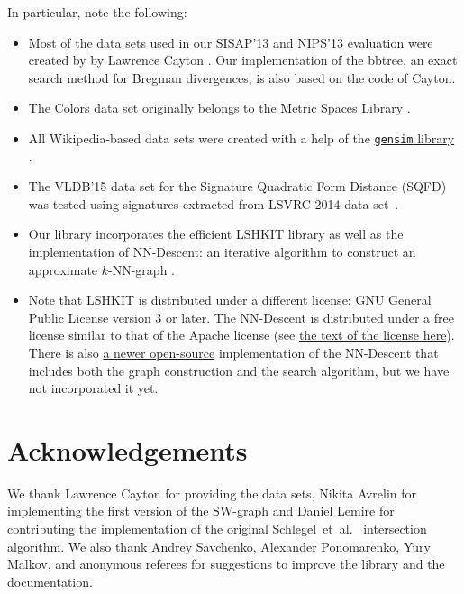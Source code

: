 \documentclass[runningheads,a4paper]{llncs}
\newcommand{\ttt}[1]{\texttt{#1}}
\newcommand{\knnns}{$k$-NN}
\begin{document}
In particular, note the following:
\begin{itemize}
\item Most of the data sets used in our SISAP'13 and NIPS'13
evaluation were created by  by Lawrence Cayton \cite{Cayton2008}.
Our implementation of the bbtree, 
an exact search method for Bregman divergences,
is also based on the code of Cayton.

\item The Colors data set originally belongs to the Metric Spaces Library \cite{LibMetricSpace}.

\item All Wikipedia-based data sets were created with a help of the \href{https://github.com/piskvorky/gensim/}{\ttt{gensim} library} \cite{rehurek_lrec}.

\item The VLDB'15 data set for the Signature Quadratic Form Distance (SQFD) \cite{Beecks:2010,Beecks:2013} 
was tested using signatures extracted from LSVRC-2014 data set~\cite{ILSVRCarxiv14}. 

\item Our library incorporates the efficient LSHKIT library
as well as the implementation of NN-Descent: 
an iterative algorithm to construct an approximate \knnns-graph \cite{dong2011efficient}.

\item Note that LSHKIT is distributed under a different license: 
GNU General Public License version 3 or later. 
The NN-Descent is distributed under a free license similar to
that of the Apache license (see \href{https://code.google.com/p/nndes/source/browse/trunk/LICENSE}{the 
text of the license here}). There is also \href{http://kgraph.org}{a newer open-source}
implementation of the NN-Descent that includes both
the graph construction and the search algorithm, but we have not incorporated it yet.

\end{itemize}

\section{Acknowledgements}
We thank 
Lawrence Cayton for providing the data sets,
Nikita Avrelin for implementing the first version of the SW-graph
and Daniel Lemire for contributing 
the implementation of the original Schlegel~et~al.~\cite{schlegel2011fast}
intersection algorithm.
We also thank Andrey Savchenko, Alexander Ponomarenko, Yury Malkov,
and anonymous referees for suggestions
to improve the library and the documentation.
\end{document}
